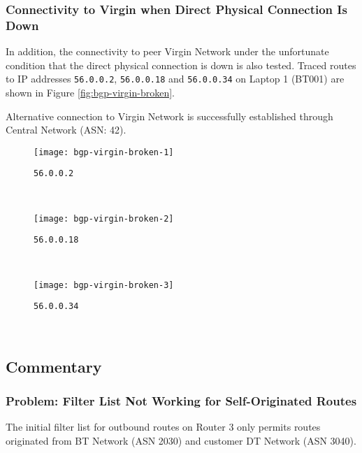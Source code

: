 \clearpage

\subsubsection{Connectivity to Virgin when Direct Physical Connection Is Down}
In addition, the connectivity to peer Virgin Network under the unfortunate condition that the direct physical connection is down is also tested. 
Traced routes to IP addresses \texttt{56.0.0.2}, \texttt{56.0.0.18} and \texttt{56.0.0.34} on Laptop 1 (BT001) are shown in Figure \ref{fig:bgp-virgin-broken}.

Alternative connection to Virgin Network is successfully established through Central Network (ASN: 42).

\begin{figure*}[ht!]
    \centering
    \begin{subfigure}[b]{\textwidth}
        \centering
        \texttt{[image: bgp-virgin-broken-1]}
        \caption{\texttt{56.0.0.2}}
    \end{subfigure}
    ~
    \begin{subfigure}[b]{\textwidth}
        \centering
        \texttt{[image: bgp-virgin-broken-2]}
        \caption{\texttt{56.0.0.18}}
    \end{subfigure}
    ~
    \begin{subfigure}[b]{\textwidth}
        \centering
        \texttt{[image: bgp-virgin-broken-3]}
        \caption{\texttt{56.0.0.34}}
    \end{subfigure}
    ~
    \caption{Tracing IPv4 Routes to Virgin Network on Laptop 1 (BT001) using \texttt{traceroute} When Direct Physical Connection Is Broken .}
    \label{fig:bgp-virgin-broken}
\end{figure*}


\subsection{Commentary}

\subsubsection{Problem: Filter List Not Working for Self-Originated Routes}

The initial filter list for outbound routes on Router 3 only permits routes originated from BT Network (ASN 2030) and customer DT Network (ASN 3040).

